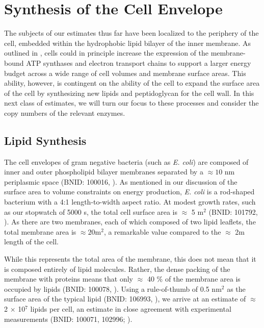 \section{Synthesis of the Cell Envelope}
The subjects of our estimates thus far have been localized to the periphery of
the cell, embedded within the hydrophobic lipid bilayer of the inner membrane.
As outlined in , cells could in principle increase the
expression of the membrane-bound ATP synthases and electron transport chains to
support a larger energy budget across a wide range of cell volumes and membrane
surface areas. This ability, however, is contingent on the ability of the cell
to expand the surface area of the cell by synthesizing new lipids and
peptidoglycan for the cell wall. In this next class of estimates, we will
turn our focus to these processes and consider the copy numbers of the relevant
enzymes.

\subsection{Lipid Synthesis}
The cell envelopes of gram negative bacteria (such as \textit{E. coli}) are
composed of inner and outer phospholipid bilayer membranes separated by a
$\approx 10$ nm periplasmic space (BNID: 100016, \cite{milo2010}). As mentioned
in our discussion of the surface area to volume constraints on energy
production, \textit{E. coli} is a rod-shaped bacterium with a 4:1
length-to-width aspect ratio. At modest growth rates, such as our stopwatch of
5000 s, the total cell surface area is $\approx$ 5 \textmu m$^2$ (BNID: 101792,
\cite{milo2010}). As there are two membranes, each of which composed of two
lipid leaflets, the total membrane area is $\approx 20$\textmu m$^2$, a
remarkable value compared to the $\approx$ 2\textmu m length of the cell.

While this represents the total area of the membrane, this does not mean that it
is composed entirely of lipid molecules. Rather, the dense packing of the
membrane with proteins means that only $\approx$ 40 \% of the membrane area is
occupied by lipids (BNID: 100078, \cite{milo2010}). Using a rule-of-thumb of 0.5
nm$^2$ as the surface area of the typical lipid (BNID: 106993, \cite{milo2010}),
we arrive at an estimate of $\approx$ 2 $\times$ 10$^7$ lipids per cell, an
estimate in close agreement with experimental measurements (BNID: 100071,
102996; \cite{milo2010}).

